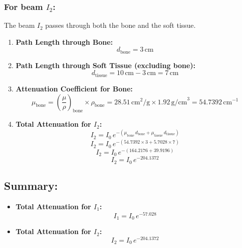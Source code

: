 \documentclass[12pt]{article}
\begin{document}
\subsubsection*{For beam $I_2$:}
The beam $I_2$ passes through both the bone and the soft tissue.

\begin{enumerate}
    \item \textbf{Path Length through Bone:}
    \[
    d_{\text{bone}} = 3 \, \text{cm}
    \]

    \item \textbf{Path Length through Soft Tissue (excluding bone):}
    \[
    d_{\text{tissue}} = 10 \, \text{cm} - 3 \, \text{cm} = 7 \, \text{cm}
    \]

    \item \textbf{Attenuation Coefficient for Bone:}
    \[
    \mu_{\text{bone}} = \left(\frac{\mu}{\rho}\right)_{\text{bone}} \times \rho_{\text{bone}} = 28.51 \, \text{cm}^2/\text{g} \times 1.92 \, \text{g/cm}^3 = 54.7392 \, \text{cm}^{-1}
    \]

    \item \textbf{Total Attenuation for $I_2$:}
    \[
    I_2 = I_0 \, e^{-(\mu_{\text{bone}} \, d_{\text{bone}} + \mu_{\text{tissue}} \, d_{\text{tissue}})}
    \]
    \[
    I_2 = I_0 \, e^{-(54.7392 \times 3 + 5.7028 \times 7)}
    \]
    \[
    I_2 = I_0 \, e^{-(164.2176 + 39.9196)}
    \]
    \[
    I_2 = I_0 \, e^{-204.1372}
    \]
\end{enumerate}

\subsection*{Summary:}
\begin{itemize}
    \item \textbf{Total Attenuation for $I_1$:}
    \[
    I_1 = I_0 \, e^{-57.028}
    \]

    \item \textbf{Total Attenuation for $I_2$:}
    \[
    I_2 = I_0 \, e^{-204.1372}
    \]
\end{itemize}
\end{document}
